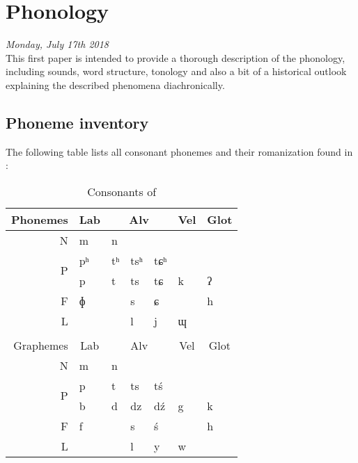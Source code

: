 \section{Phonology}
\emph{Monday, July 17th 2018}\\

\noindent This first paper is intended to provide a thorough description of the \lang{} phonology, including sounds, word structure, tonology and also a bit of a historical outlook explaining the described phenomena diachronically.

\subsection{Phoneme inventory}
The following table lists all consonant phonemes and their romanization found in \lang{}:
\begin{table}[H]
\centering
\begin{tabular}{r|l|lll|l|l}
Phonemes           & \multicolumn{1}{c|}{Lab} & \multicolumn{3}{c|}{Alv} & \multicolumn{1}{c|}{Vel} & \multicolumn{1}{c}{Glot} \\ \hline
N                  & m                        & n      &        &        &                          &                          \\
\multirow{2}{*}{P} & pʰ                       & tʰ     & tsʰ    & tɕʰ    &                          &                          \\
                   & p                        & t      & ts     & tɕ     & k                        & ʔ                        \\
F                  & ɸ                        &        & s      & ɕ      &                          & h                        \\
L                  &                          &        & l      & j      & ɰ                        & \\
\multicolumn{1}{c}{}\\                        
Graphemes          & \multicolumn{1}{c|}{Lab} & \multicolumn{3}{c|}{Alv} & \multicolumn{1}{c|}{Vel} & \multicolumn{1}{c}{Glot} \\ \hline
N                  & m                        & n      &        &        &                          &                          \\
\multirow{2}{*}{P} & p                        & t      & ts     & tś     &                          &                          \\
                   & b                        & d      & dz     & dź     & g & k                        \\
F                  & f                        &        & s      & ś      &                          & h                        \\
L                  &                          &        & l      & y      & w                        &                         
\end{tabular}
\label{consonants}
\caption{Consonants of \lang{}}
\end{table}

